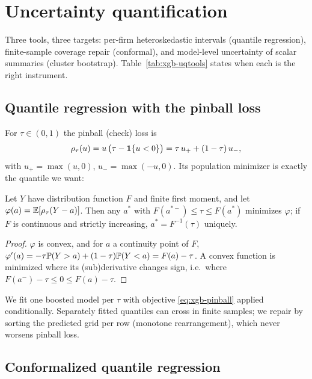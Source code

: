 \section{Uncertainty quantification}
\label{sec:xgb-uq}

Three tools, three targets: per-firm heteroskedastic intervals (quantile regression),
finite-sample coverage repair (conformal), and model-level uncertainty of scalar
summaries (cluster bootstrap). Table~\ref{tab:xgb-uqtools} states when each is the right
instrument.

\subsection{Quantile regression with the pinball loss}

For $\tau \in (0,1)$ the pinball (check) loss is
\begin{equation}
\rho_\tau(u) = u\,\bigl(\tau - \mathbf{1}\{u < 0\}\bigr)
= \tau\, u_+ + (1-\tau)\, u_-,
\label{eq:xgb-pinball}
\end{equation}
with $u_+ = \max(u,0)$, $u_- = \max(-u,0)$. Its population minimizer is exactly the
quantile we want:

\begin{proposition}
\label{prop:xgb-pinball}
Let $Y$ have distribution function $F$ and finite first moment, and let
$\varphi(a) = \mathbb{E}[\rho_\tau(Y - a)]$. Then any $a^*$ with $F(a^{*-}) \le \tau \le F(a^*)$
minimizes $\varphi$; if $F$ is continuous and strictly increasing,
$a^* = F^{-1}(\tau)$ uniquely.
\end{proposition}

\begin{proof}
$\varphi$ is convex, and for $a$ a continuity point of $F$,
$\varphi'(a) = -\tau \mathbb{P}(Y > a) + (1-\tau)\mathbb{P}(Y < a) = F(a) - \tau$.
A convex function is minimized where its (sub)derivative changes sign, i.e.\ where
$F(a^{-}) - \tau \le 0 \le F(a) - \tau$.
\end{proof}

We fit one boosted model per $\tau$ with objective \eqref{eq:xgb-pinball} applied
conditionally. Separately fitted quantiles can cross in finite samples; we repair by
sorting the predicted grid per row (monotone rearrangement), which never worsens pinball
loss.

\subsection{Conformalized quantile regression}

